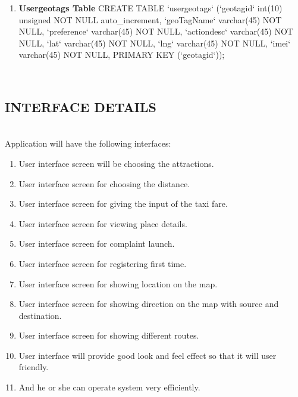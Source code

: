 \documentclass[12pt,a4paper]{article}
\begin{document}
\begin{enumerate}
\\
\item \textbf{Usergeotags Table}
\hspace{0.7 cm}CREATE TABLE `usergeotags` (`geotagid` int(10) unsigned NOT NULL auto_increment, `geoTagName` varchar(45) NOT NULL, `preference` varchar(45) NOT NULL, `actiondesc` varchar(45) NOT NULL, `lat` varchar(45) NOT NULL, `lng` varchar(45) NOT NULL, `imei` varchar(45) NOT NULL, PRIMARY KEY  (`geotagid`)); 
\\
\end{enumerate}
\\
\subsection{INTERFACE DETAILS}
\\
\hspace{0.7 cm} Application will have the following interfaces:
\\
\begin{enumerate}
\\
\item User interface screen will be choosing the attractions.
\\
\item User interface screen for choosing the distance.
\\
\item User interface screen for giving the input of the taxi fare.
\\
\item User interface screen for viewing place details.
\\
\item User interface screen for complaint launch.
\\
\item User interface screen for registering first time.
\\
\item User interface screen for showing location on the map.
\\
\item User interface screen for showing direction on the map with source and destination.
\\
\item User interface screen for showing different routes.
\\
\item User interface will provide good look and feel effect so that it will user friendly.
\\
\item And he or she can operate system very efficiently.
\\
\end{enumerate}
\\
\end{document}
